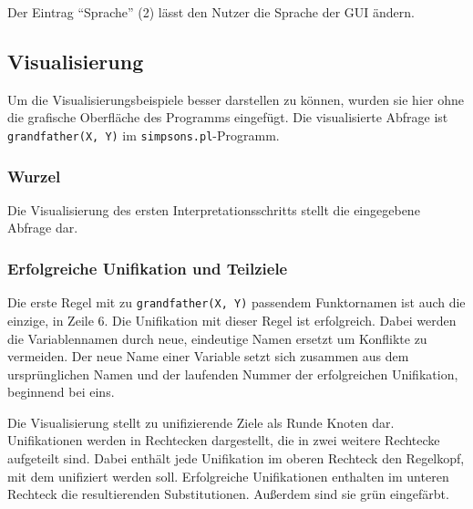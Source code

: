 \documentclass[parskip=full,11pt,twoside]{scrartcl}
\begin{document}
Der Eintrag \enquote{Sprache} (2) lässt den Nutzer die Sprache der GUI ändern.

\subsection{Visualisierung}

Um die Visualisierungsbeispiele besser darstellen zu können, wurden sie hier ohne die grafische Oberfläche des Programms eingefügt.
Die visualisierte Abfrage ist \texttt{grandfather(X, Y)} im \texttt{simpsons.pl}-Programm.

\subsubsection{Wurzel}

\begin{minipage}{\linewidth}
\end{minipage}

Die Visualisierung des ersten Interpretationsschritts stellt die eingegebene Abfrage dar.

\subsubsection{Erfolgreiche Unifikation und Teilziele}

Die erste Regel mit zu \texttt{grandfather(X, Y)} passendem Funktornamen ist auch die einzige, in Zeile 6.
Die Unifikation mit dieser Regel ist erfolgreich.
Dabei werden die Variablennamen durch neue, eindeutige Namen ersetzt um Konflikte zu vermeiden.
Der neue Name einer Variable setzt sich zusammen aus dem ursprünglichen Namen und der laufenden Nummer der erfolgreichen Unifikation, beginnend bei eins.

\begin{minipage}{\linewidth}
\end{minipage}

Die Visualisierung stellt zu unifizierende Ziele als Runde Knoten dar.
Unifikationen werden in  Rechtecken dargestellt, die in zwei weitere Rechtecke aufgeteilt sind.
Dabei enthält jede Unifikation im oberen Rechteck den Regelkopf, mit dem unifiziert werden soll.
Erfolgreiche Unifikationen enthalten im unteren Rechteck die resultierenden Substitutionen.
Außerdem sind sie grün eingefärbt.
\end{document}
